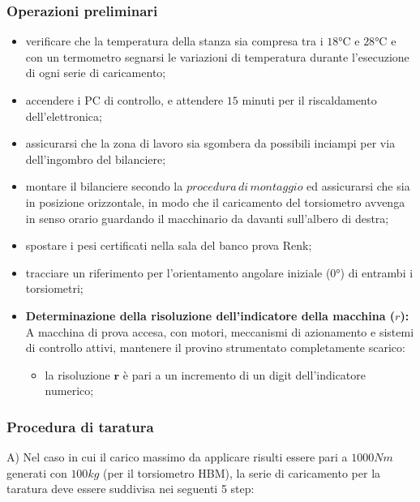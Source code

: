 \documentclass[a4paper, twoside]{article}
\begin{document}
\subsubsection{Operazioni preliminari}
\begin{itemize}
    \item verificare che la temperatura della stanza sia compresa tra i $18$°C e $28$°C e con un termometro segnarsi le variazioni di temperatura durante l'esecuzione di ogni serie di caricamento;  
    \item accendere i PC di controllo, e attendere $15$ minuti per il riscaldamento dell'elettronica;
    \item assicurarsi che la zona di lavoro sia sgombera da possibili inciampi per via dell'ingombro del bilanciere;
    \item montare il bilanciere secondo la $procedura \, di \, montaggio$ ed assicurarsi che sia in posizione orizzontale, in modo che il caricamento del torsiometro avvenga in senso orario guardando il macchinario da davanti sull'albero di destra;
    \item spostare i pesi certificati nella sala del banco prova Renk;
    \item tracciare un riferimento per l'orientamento angolare iniziale ($0$°) di entrambi i torsiometri;
    \item \textbf{Determinazione della risoluzione dell'indicatore della macchina ($r$):} A macchina di prova accesa, con motori, meccanismi di azionamento e sistemi di controllo attivi, mantenere il provino strumentato completamente scarico:
    
    \begin{itemize}

        \item la risoluzione $\mathbf{r}$ è pari a un incremento di un digit dell'indicatore numerico;

    \end{itemize}


\end{itemize}

\subsubsection{Procedura di taratura}
A) Nel caso in cui il carico massimo da applicare risulti essere pari a $1000Nm$ generati con $100kg$ (per il torsiometro HBM), la serie di caricamento per la taratura deve essere suddivisa nei seguenti 5 step:
\end{document}
